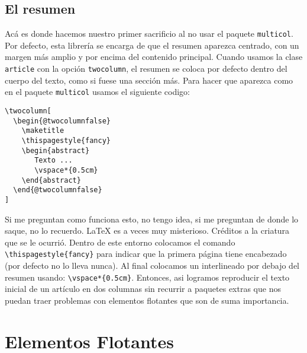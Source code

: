 \documentclass[a4paper,10pt,twocolumn,twoside]{article}
\begin{document}
\subsection{El resumen}
Acá es donde hacemos nuestro primer sacrificio al no usar el paquete \texttt{multicol}. Por defecto, esta librería se encarga de que el resumen aparezca centrado, con un margen más amplio y por encima del contenido principal. Cuando usamos la clase \texttt{article} con la opción \texttt{twocolumn}, el resumen se coloca por defecto dentro del cuerpo del texto, como si fuese una sección más. Para hacer que aparezca como en el paquete \texttt{multicol} usamos el siguiente codigo:
\begin{Verbatim}[fontsize=\fontsize{7pt}{7pt}\selectfont]
\twocolumn[
  \begin{@twocolumnfalse}
    \maketitle
    \thispagestyle{fancy}
    \begin{abstract}
       Texto ...
       \vspace*{0.5cm}
    \end{abstract}
  \end{@twocolumnfalse}
]
\end{Verbatim}
Si me preguntan como funciona esto, no tengo idea, si me preguntan de donde lo saque, no lo recuerdo. \LaTeX{} es a veces muy misterioso. Créditos a la criatura que se le ocurrió. Dentro de este entorno colocamos el comando \verb+\thispagestyle{fancy}+ para indicar que la primera página tiene encabezado (por defecto no lo lleva nunca). Al final colocamos un interlineado por debajo del resumen usando: \verb+\vspace*{0.5cm}+. Entonces, asi logramos reproducir el texto inicial de un artículo en dos columnas sin recurrir a paquetes extras que nos puedan traer problemas con elementos flotantes que son de suma importancia.

\section{Elementos Flotantes}
\end{document}
